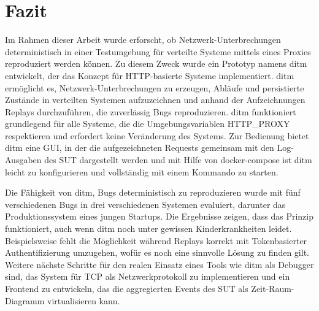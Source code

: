 \documentclass[12pt,a4paper]{report}
\begin{document}




\chapter{Fazit}
Im Rahmen dieser Arbeit wurde erforscht, ob Netzwerk-Unterbrechungen deterministisch in einer Testumgebung für verteilte Systeme
mittels eines Proxies reproduziert werden können. Zu diesem Zweck wurde ein Prototyp namens ditm entwickelt, der das Konzept für
HTTP-basierte Systeme implementiert. ditm ermöglicht es, Netzwerk-Unterbrechungen zu erzeugen, Abläufe und persistierte Zustände
in verteilten Systemen aufzuzeichnen und anhand der Aufzeichnungen Replays durchzuführen, die zuverlässig Bugs reproduzieren. ditm
funktioniert grundlegend für alle Systeme, die die Umgebungsvariablen HTTP\_PROXY respektieren und erfordert keine Veränderung des
Systems. Zur Bedienung bietet ditm eine GUI, in der die aufgezeichneten Requests gemeinsam mit den Log-Ausgaben des SUT
dargestellt werden und mit Hilfe von docker-compose ist ditm leicht zu konfigurieren und vollständig mit einem Kommando zu starten.

Die Fähigkeit von ditm, Bugs deterministisch zu reproduzieren wurde mit fünf verschiedenen Bugs in drei verschiedenen Systemen
evaluiert, darunter das Produktionssystem eines jungen Startups. Die Ergebnisse zeigen, dass das Prinzip funktioniert, auch wenn
ditm noch unter gewissen Kinderkrankheiten leidet. Beispielsweise fehlt die Möglichkeit während Replays korrekt mit Tokenbasierter
Authentifizierung umzugehen, wofür es noch eine sinnvolle Lösung zu finden gilt. Weitere nächste Schritte für den realen Einsatz
eines Tools wie ditm als Debugger sind, das System für TCP als Netzwerkprotokoll zu implementieren und ein Frontend zu entwickeln,
das die aggregierten Events des SUT als Zeit-Raum-Diagramm virtualisieren kann.
\end{document}

